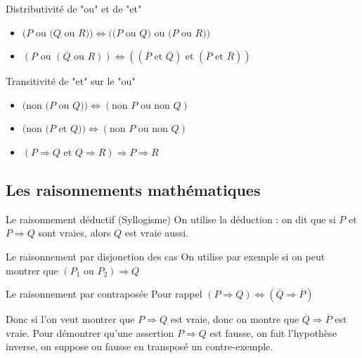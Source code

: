 \documentclass[a4paper,11pt]{article}
\begin{document}
\begin{propbox}{Distributivité de "ou" et de "et"}
\begin{itemize}
    \item $(P$ ou $(Q$ ou $R)) \Leftrightarrow ((P$ ou $Q)$ ou $(P$ ou $R))$
    \item $\overline{(P \text{ ou } (Q \text{ ou } R))} \Leftrightarrow ((\overline{P} \text{ et } \overline{Q}) \text{ et } (\overline{P} \text{ et } \overline{R}))$
\end{itemize}
\end{propbox}

\begin{propbox}{Transitivité de "et" sur le "ou"}
\begin{itemize}
    \item $(\text{non } (P$ ou $Q)) \Leftrightarrow (\text{non } P \text{ ou non } Q)$
    \item $(\text{non } (P$ et $Q)) \Leftrightarrow (\text{non } P \text{ ou non } Q)$
    \item $(P \Rightarrow Q \text{ et } Q \Rightarrow R) \Rightarrow P \Rightarrow R$
\end{itemize}
\end{propbox}

\subsection{Les raisonnements mathématiques}

\begin{methodbox}{Le raisonnement déductif (Syllogisme)}
On utilise la déduction : on dit que si $P$ et $P \Rightarrow Q$ sont vraies, alors $Q$ est vraie aussi.
\end{methodbox}

\begin{methodbox}{Le raisonnement par disjonction des cas}
On utilise par exemple si on peut montrer que $(P_1 \text{ ou } P_2) \Rightarrow Q$
\end{methodbox}

\begin{methodbox}{Le raisonnement par contraposée}
Pour rappel $(P \Rightarrow Q) \Leftrightarrow (\overline{Q} \Rightarrow \overline{P})$

Donc si l'on veut montrer que $P \Rightarrow Q$ est vraie, donc on montre que $\overline{Q} \Rightarrow \overline{P}$ est vraie. Pour démontrer qu'une assertion $P \Rightarrow Q$ est fausse, on fait l'hypothèse inverse, on suppose ou fausse en transposé un contre-exemple.
\end{methodbox}
\end{document}
